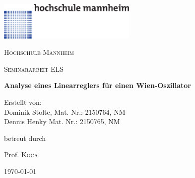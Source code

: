 \begin{titlepage}

  \includegraphics[width=0.5\textwidth]{../common/hsma-logo.pdf}\par\vspace{1cm}
  \centering
	{\scshape\LARGE Hochschule Mannheim \par}
	\vspace{1cm}
	{\scshape\Large Seminararbeit ELS\par}
	\vspace{1.5cm}
	{\huge\bfseries Analyse eines Linearreglers für einen Wien-Oszillator\par}
	\vspace{2cm}
	{\Large Erstellt von:\\
	Dominik Stolte, Mat. Nr.: 2150764, NM\\ 
	Dennis Henky Mat. Nr.: 2150765, NM\par}
	\vfill
	betreut durch\par
	Prof. \textsc{Koca}
	\vfill
	{\large \today\par}
\end{titlepage}